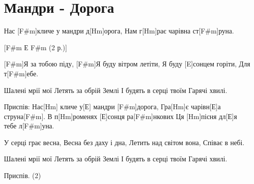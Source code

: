 \section{Мандри - Дорога}
\begin{guitar}

Нас [F#m]кличе у мандри д[Hm]орога,
Нам г[Hm]рає чарівна ст[F#m]руна.

[F#m Е F#m (2 р.)]

[F#m]Я за тобою піду,
[F#m]Я буду вітром летіти,
Я буду [E]сонцем горіти,
Для т[F#m]ебе.


Шалені мрії мої
Летять за обрій Землі
І будять в серці твоїм
Гарячі хвилі.

Приспів:                
Нас[Hm] кличе у[Е] мандри [F#m]дорога,
Гра[Hm]є чарівн[Е]а струна[F#m].
В п[Hm]роменях [Е]сонця ра[F#m]нкових
Ця [Hm]пісня дл[Е]я тебе л[F#m]уна.


У серці грає весна,
Весна без даху і дна,
Летить над світом вона,
Співає в небі.


Шалені мрії мої
Летять за обрій Землі
І будять в серці твоїм
Гарячі хвилі.

Приспів. (2)
\end{guitar}
